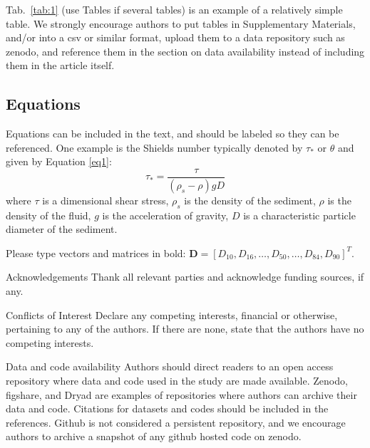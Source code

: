 \documentclass[breakmath, anonymous]{geomorphica}
\begin{document}
Tab.~\ref{tab:1} (use Tables if several tables) is an example of a relatively simple table. We strongly encourage authors to put tables in Supplementary Materials, and/or into a csv or similar format, upload them to a data repository such as zenodo, and reference them in the section on data availability instead of including them in the article itself. 
	
\subsection{Equations}
Equations can be included in the text, and should be labeled so they can be referenced. One example is the Shields number typically denoted by  $\tau_ *$ or $ \theta$ and given by Equation \ref{eq1}:
\begin{equation}\label{eq1}
	\tau_* = \frac{\tau}{\left(\rho_s - \rho \right)gD}
\end{equation}
where $\tau$ is a dimensional shear stress, $\rho_s$ is the density of the sediment, $\rho$ is the density of the fluid, $g$ is the acceleration of gravity, $D$ is a characteristic particle diameter of the sediment.
	
Please type vectors and matrices in bold: $\mathbf{D} = \left[D_{10}, D_{16}, \ldots, D_{50}, \ldots, D_{84}, D_{90} \right]^T$.
  
\begin{closing}{Acknowledgements}
    Thank all relevant parties and acknowledge funding sources, if any.
\end{closing}
\begin{closing}{Conflicts of Interest}
    Declare any competing interests, financial or otherwise, pertaining to any of the authors. If there are none, state that the authors have no competing interests.
\end{closing}
\begin{closing}{Data and code availability}
	Authors should direct readers to an open access repository where data and code used in the study are made available. Zenodo, figshare, and Dryad are examples of repositories where authors can archive their data and code. Citations for datasets and codes should be included in the references. Github is not considered a persistent repository, and we encourage authors to archive a snapshot of any github hosted code on zenodo.
\end{closing}

	
\end{document}
